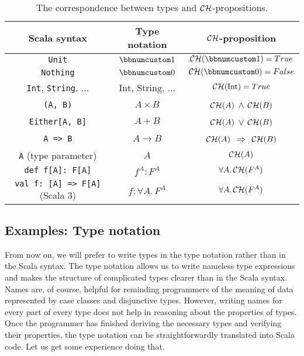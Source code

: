 \begin{table}
\begin{centering}
\begin{tabular}{|c|c|c|}
\hline 
\textbf{\small{}Scala syntax} & \textbf{\small{}Type notation} & \textbf{\small{}${\cal CH}$-proposition}\tabularnewline
\hline 
\hline 
\lstinline!Unit! & $\bbnum 1$ & ${\cal CH}(\bbnum 1)=True$\tabularnewline
\hline 
\lstinline!Nothing! & $\bbnum 0$ & ${\cal CH}(\bbnum 0)=False$\tabularnewline
\hline 
{\small{}}\lstinline!Int!{\small{}, }\lstinline!String!{\small{},
...} & {\small{}$\text{Int}$, $\text{String}$, ...} & ${\cal CH}(\text{Int})=True$\tabularnewline
\hline 
\lstinline!(A, B)! & $A\times B$ & ${\cal CH}(A)$ $\wedge$ ${\cal CH}(B)$\tabularnewline
\hline 
\lstinline!Either[A, B]! & $A+B$ & ${\cal CH}(A)$ $\vee$ ${\cal CH}(B)$\tabularnewline
\hline 
\lstinline!A => B! & $A\rightarrow B$ & ${\cal CH}(A)$ $\Rightarrow$ ${\cal CH}(B)$\tabularnewline
\hline 
\lstinline!A!{\small{} (type parameter)} & $A$ & ${\cal CH}(A)$\tabularnewline
\hline 
\lstinline!def f[A]: F[A]! & $f^{A}:F^{A}$ & $\forall A.\,{\cal CH}(F^{A})$\tabularnewline
\hline 
\lstinline!val f: [A] => F[A]!{\small{} (Scala 3)} & $f:\forall A.\,F^{A}$ & $\forall A.\,{\cal CH}(F^{A})$\tabularnewline
\hline 
\end{tabular}
\par\end{centering}
\caption{The correspondence between types and ${\cal CH}$-propositions.\label{tab:ch-correspondence-type-notation-CH-propositions}}
\end{table}


\subsection{Examples: Type notation}

From now on, we will prefer to write types in the type notation rather
than in the Scala syntax. The type notation allows us to write nameless
type expressions and makes the structure of complicated types clearer
than in the Scala syntax. Names are, of course, helpful for reminding
programmers of the meaning of data represented by case classes and
disjunctive types. However, writing names for every part of every
type does not help in reasoning about the properties of types. Once
the programmer has finished deriving the necessary types and verifying
their properties, the type notation can be straightforwardly translated
into Scala code. Let us get some experience doing that.

